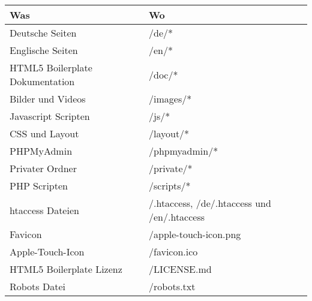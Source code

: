 \documentclass[a4paper,10pt]{scrreprt}
\begin{document}
\begin{table}[!htbp]
 \centering
 \begin{tabular}{p{7cm}|p{8.5cm}}
  Was & Wo \\
  \hline
  Deutsche Seiten & /de/*  \\
  Englische Seiten & /en/* \\
  HTML5 Boilerplate Dokumentation & /doc/* \\
  Bilder und Videos & /images/* \\
  Javascript Scripten & /js/* \\
  CSS und Layout & /layout/* \\
  PHPMyAdmin & /phpmyadmin/* \\
  Privater Ordner & /private/* \\
  PHP Scripten & /scripts/* \\
  htaccess Dateien & /.htaccess, /de/.htaccess und /en/.htaccess \\
  Favicon& /apple-touch-icon.png \\
  Apple-Touch-Icon & /favicon.ico \\
  HTML5 Boilerplate Lizenz & /LICENSE.md \\
  Robots Datei & /robots.txt \\

 \end{tabular}
\end{table}
\end{document}
